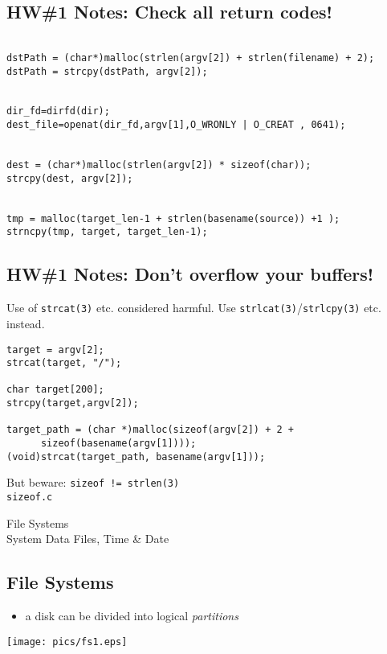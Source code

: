 \documentclass[xga]{xdvislides}
\begin{document}
\subsection{HW\#1 Notes: Check all return codes!}
\begin{verbatim}

dstPath = (char*)malloc(strlen(argv[2]) + strlen(filename) + 2);
dstPath = strcpy(dstPath, argv[2]);


dir_fd=dirfd(dir);
dest_file=openat(dir_fd,argv[1],O_WRONLY | O_CREAT , 0641);


dest = (char*)malloc(strlen(argv[2]) * sizeof(char));
strcpy(dest, argv[2]);


tmp = malloc(target_len-1 + strlen(basename(source)) +1 );
strncpy(tmp, target, target_len-1);
\end{verbatim}
\Normalsize

\subsection{HW\#1 Notes: Don't overflow your buffers!}
Use of \verb+strcat(3)+ etc. considered harmful.
Use \verb+strlcat(3)+/\verb+strlcpy(3)+ etc. instead.
\begin{verbatim}
target = argv[2];
strcat(target, "/");

char target[200];
strcpy(target,argv[2]);

target_path = (char *)malloc(sizeof(argv[2]) + 2 +
      sizeof(basename(argv[1])));
(void)strcat(target_path, basename(argv[1]));
\end{verbatim}
\vspace{.25in}
But beware: \verb+sizeof != strlen(3)+ \\

\verb+sizeof.c+
\vspace*{\fill}

\pagebreak

\vspace*{\fill}
\begin{center}
  \Hugesize
	File Systems
	\hspace*{5mm}\blueline\\ [1em]
	System Data Files, Time \& Date
  \Normalsize
\end{center}
\vspace*{\fill}



\subsection{File Systems}
\begin{itemize}
	\item a disk can be divided into logical {\em partitions}
\end{itemize}
\texttt{[image: pics/fs1.eps]}
\end{document}
